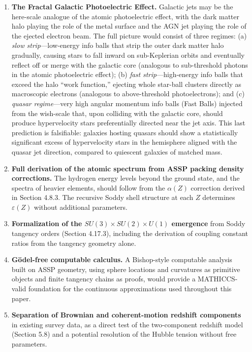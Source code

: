 \documentclass[11pt,a4paper]{article}
\begin{document}
\begin{enumerate}

  \item \textbf{The Fractal Galactic Photoelectric Effect.} Galactic jets may be the here-scale analogue of the atomic photoelectric effect, with the dark matter halo playing the role of the metal surface and the AGN jet playing the role of the ejected electron beam. The full picture would consist of three regimes: (a) \textit{slow strip}---low-energy info balls that strip the outer dark matter halo gradually, causing stars to fall inward on sub-Keplerian orbits and eventually reflect off or merge with the galactic core (analogous to sub-threshold photons in the atomic photoelectric effect); (b) \textit{fast strip}---high-energy info balls that exceed the halo ``work function,'' ejecting whole star-ball clusters directly as macroscopic electrons (analogous to above-threshold photoelectrons); and (c) \textit{quasar regime}---very high angular momentum info balls (Fast Balls) injected from the wish-scale that, upon colliding with the galactic core, should produce hypervelocity stars preferentially directed near the jet axis. This last prediction is falsifiable: galaxies hosting quasars should show a statistically significant excess of hypervelocity stars in the hemisphere aligned with the quasar jet direction, compared to quiescent galaxies of matched mass.

  \item \textbf{Full derivation of the atomic spectrum from ASSP packing density corrections.} The hydrogen energy levels beyond the ground state, and the spectra of heavier elements, should follow from the $\alpha(Z)$ correction derived in Section 4.8.3. The recursive Soddy shell structure at each $Z$ determines $\varepsilon(Z)$ without additional parameters.

  \item \textbf{Formalization of the $SU(3)\times SU(2)\times U(1)$ emergence} from Soddy tangency orders (Section 4.17.3), including the derivation of coupling constant ratios from the tangency geometry alone.

  \item \textbf{Gödel-free computable calculus.} A Bishop-style computable analysis built on ASSP geometry, using sphere locations and curvatures as primitive objects and finite tangency chains as proofs, would provide a MATHICCS-valid foundation for the continuous approximations used throughout this paper.

  \item \textbf{Separation of Brownian and coherent-motion redshift components} in existing survey data, as a direct test of the two-component redshift model (Section 5.8) and a potential resolution of the Hubble tension without free parameters.

\end{enumerate}
\end{document}
